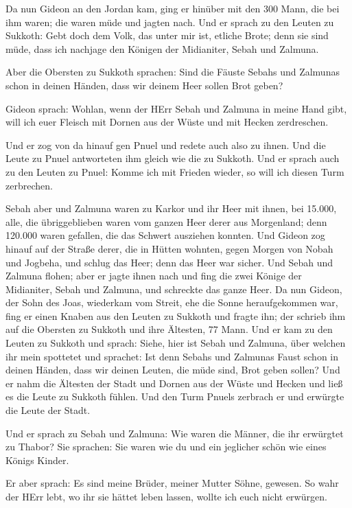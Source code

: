  Da nun Gideon an den Jordan kam, ging er hinüber mit den
300 Mann, die bei ihm waren; die waren müde und jagten nach.
 Und er sprach zu den Leuten zu Sukkoth: Gebt doch dem Volk,
das unter mir ist, etliche Brote; denn sie sind müde, dass ich nachjage
den Königen der Midianiter, Sebah und Zalmuna.

 Aber die Obersten zu Sukkoth sprachen: Sind die Fäuste
Sebahs und Zalmunas schon in deinen Händen, dass wir deinem Heer sollen
Brot geben?

 Gideon sprach: Wohlan, wenn der HErr Sebah und Zalmuna in
meine Hand gibt, will ich euer Fleisch mit Dornen aus der Wüste und mit
Hecken zerdreschen.

 Und er zog von da hinauf gen Pnuel und redete auch also zu
ihnen. Und die Leute zu Pnuel antworteten ihm gleich wie die zu Sukkoth.
 Und er sprach auch zu den Leuten zu Pnuel: Komme ich mit
Frieden wieder, so will ich diesen Turm zerbrechen.

 Sebah aber und Zalmuna waren zu Karkor und ihr Heer mit
ihnen, bei 15.000, alle, die übriggeblieben waren vom ganzen Heer derer
aus Morgenland; denn 120.000 waren gefallen, die das Schwert ausziehen
konnten.  Und Gideon zog hinauf auf der Straße derer, die
in Hütten wohnten, gegen Morgen von Nobah und Jogbeha, und schlug das
Heer; denn das Heer war sicher.  Und Sebah und Zalmuna
flohen; aber er jagte ihnen nach und fing die zwei Könige der
Midianiter, Sebah und Zalmuna, und schreckte das ganze Heer.
 Da nun Gideon, der Sohn des Joas, wiederkam vom Streit,
ehe die Sonne heraufgekommen war,  fing er einen Knaben aus
den Leuten zu Sukkoth und fragte ihn; der schrieb ihm auf die Obersten
zu Sukkoth und ihre Ältesten, 77 Mann.  Und er kam zu den
Leuten zu Sukkoth und sprach: Siehe, hier ist Sebah und Zalmuna, über
welchen ihr mein spottetet und sprachet: Ist denn Sebahs und Zalmunas
Faust schon in deinen Händen, dass wir deinen Leuten, die müde sind,
Brot geben sollen?  Und er nahm die Ältesten der Stadt und
Dornen aus der Wüste und Hecken und ließ es die Leute zu Sukkoth fühlen.
 Und den Turm Pnuels zerbrach er und erwürgte die Leute der
Stadt.

 Und er sprach zu Sebah und Zalmuna: Wie waren die Männer,
die ihr erwürgtet zu Thabor? Sie sprachen: Sie waren wie du und ein
jeglicher schön wie eines Königs Kinder.

 Er aber sprach: Es sind meine Brüder, meiner Mutter Söhne,
gewesen. So wahr der HErr lebt, wo ihr sie hättet leben lassen, wollte
ich euch nicht erwürgen.

